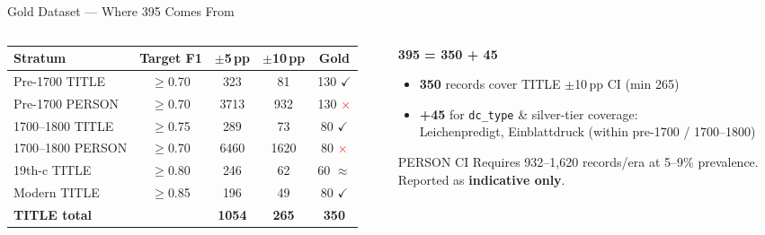 \documentclass[xcolor,aspectratio=169,compress]{beamer}
\begin{document}
\begin{frame}{Gold Dataset --- Where 395 Comes From}
  \small
  \begin{columns}
    \begin{column}{.60\textwidth}
      \footnotesize
      \begin{tabular}{lcccc}
        \toprule
        Stratum & Target F1 & $\pm$5\,pp & $\pm$10\,pp & Gold \\
        \midrule
        Pre-1700 TITLE    & $\geq$0.70 &  323 &  81 & 130 \textcolor{green!60!black}{$\checkmark$} \\
        Pre-1700 PERSON   & $\geq$0.70 & 3713 & 932 & 130 \textcolor{red}{$\times$} \\
        1700--1800 TITLE  & $\geq$0.75 &  289 &  73 &  80 \textcolor{green!60!black}{$\checkmark$} \\
        1700--1800 PERSON & $\geq$0.70 & 6460 & 1620 &  80 \textcolor{red}{$\times$} \\
        19th-c TITLE      & $\geq$0.80 &  246 &  62 &  60 \textcolor{green!60!black}{$\approx$} \\
        Modern TITLE      & $\geq$0.85 &  196 &  49 &  80 \textcolor{green!60!black}{$\checkmark$} \\
        \midrule
        \textbf{TITLE total} & & \textbf{1054} & \textbf{265} & \textbf{350} \\
        \bottomrule
      \end{tabular}
    \end{column}
    \begin{column}{.38\textwidth}
      \textbf{395 = 350 + 45}
      \begin{itemize}\setlength{\itemsep}{2pt}
        \item \textbf{350} records cover TITLE $\pm$10\,pp CI (min 265)
        \item \textbf{+45} for \texttt{dc\_type} \& silver-tier coverage:\\ Leichenpredigt, Einblattdruck (within pre-1700 / 1700--1800)
      \end{itemize}
      \smallskip
      \begin{alertblock}{PERSON CI}
        Requires 932--1,620 records/era at 5--9\% prevalence. \\
        Reported as \textbf{indicative only}.
      \end{alertblock}
    \end{column}
  \end{columns}
\end{frame}
\end{document}
